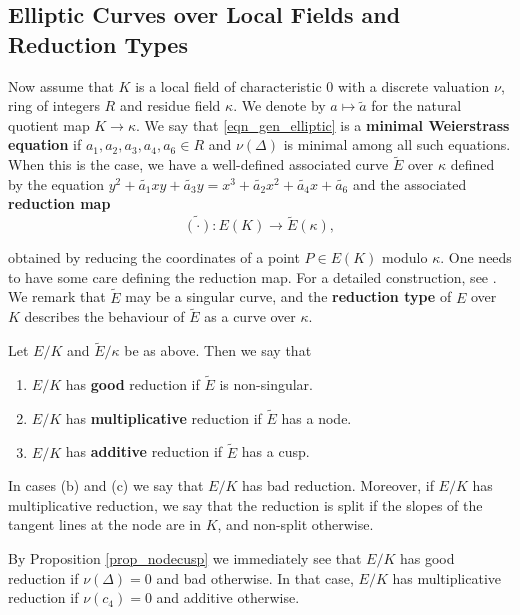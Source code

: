 \subsection{Elliptic Curves over Local Fields and Reduction Types}

Now assume that $K$ is a local field of characteristic $0$ with a discrete valuation $\nu$, ring of integers $R$ and residue field $\kappa$. We denote by $a\mapsto \tilde{a}$ for the natural quotient map $K\to\kappa$. We say that \eqref{eqn_gen_elliptic} is a \textbf{minimal Weierstrass equation} if $a_1,a_2,a_3,a_4,a_6\in R$ and $\nu(\Delta)$ is minimal among all such equations. When this is the case, we have a well-defined associated curve $\tilde{E}$ over $\kappa$ defined by the equation $y^2+\tilde{a_1}xy+\tilde{a_3}y=x^3+\tilde{a_2}x^2+\tilde{a_4}x+\tilde{a_6}$ and the associated \textbf{reduction map}
\begin{equation}\label{eqn_reduction}
    \widetilde{(\cdot)}:E(K)\longrightarrow \tilde{E}(\kappa),
\end{equation}

obtained by reducing the coordinates of a point $P\in E(K)$ modulo $\kappa$. One needs to have some care defining the reduction map. For a detailed construction, see \cite[\S1 VII.2]{S1}. We remark that $\tilde{E}$ may be a singular curve, and the \textbf{reduction type} of $E$ over $K$ describes the behaviour of $\tilde{E}$ as a curve over $\kappa$.

\begin{defn}
    Let $E/K$ and $\tilde{E}/\kappa$ be as above. Then we say that 
    \begin{enumerate}[label={(\alph*)}]
        \item $E/K$ has \textbf{good} reduction if $\tilde{E}$ is non-singular.
        \item $E/K$ has \textbf{multiplicative} reduction if $\tilde{E}$ has a node.
        \item $E/K$ has \textbf{additive} reduction if $\tilde{E}$ has a cusp.
    \end{enumerate}
    In cases (b) and (c) we say that $E/K$ has bad reduction. Moreover, if $E/K$ has multiplicative reduction, we say that the reduction is split if the slopes of the tangent lines at the node are in $K$, and non-split otherwise.
\end{defn}

By Proposition \ref*{prop_nodecusp} we immediately see that $E/K$ has good reduction if $\nu(\Delta)=0$ and bad otherwise. In that case, $E/K$ has multiplicative reduction if $\nu(c_4)=0$ and additive otherwise.

